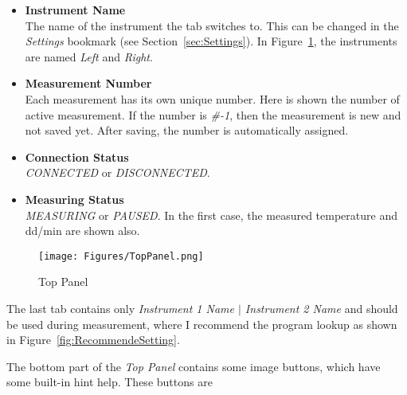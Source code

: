 \documentclass[a4paper,11pt,oneside]{report}
\theoremstyle{named}
\begin{document}
\begin{itemize}
  \item \textbf{Instrument Name} \\
    The name of the instrument the tab switches to. This can be changed in the
    \textit{Settings} bookmark (see Section~\ref{sec:Settings}). In
    Figure~\ref{fig:TopPanel}, the instruments are named \textit{Left} and
    \textit{Right}.
  \item \textbf{Measurement Number} \\
    Each measurement has its own unique number. Here is shown the number of
    active measurement. If the number is \textit{\#-1}, then the measurement is
    new and not saved yet. After saving, the number is automatically assigned.
  \item \textbf{Connection Status} \\
    \textit{CONNECTED} or \textit{DISCONNECTED}. 
  \item \textbf{Measuring Status} \\
    \textit{MEASURING} or \textit{PAUSED}. In the first case, the measured
    temperature and dd/min are shown also. 
\end{itemize}

\begin{figure}[t]
  \centering
  \texttt{[image: Figures/TopPanel.png]}
  \caption{Top Panel}
  \label{fig:TopPanel}
\end{figure}

The last tab contains only \textit{Instrument 1 Name $|$ Instrument 2 Name} and
should be used during measurement, where I recommend the program
lookup as shown in Figure~\ref{fig:RecommendeSetting}.

The bottom part of the \textit{Top Panel} contains some image buttons, which
have some built-in hint help. These buttons are
\end{document}
